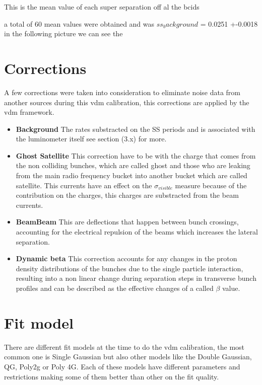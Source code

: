 This is the mean value of each super separation off al the bcids

 a total of 60 mean values were obtained and was $ss_background$ = 0.0251 +-0.0018 in the following picture we can see the 



\section{Corrections}

A few corrections were taken into consideration to eliminate noise data from another sources during this vdm calibration, this corrections are applied by the vdm framework. 

\begin{itemize}
  \item \textbf{Background} The rates substracted on the SS periods and is associated with the luminometer itself see section (3.x) for more.
  \item \textbf {Ghost Satellite} This correction have to be with the charge that comes from the non colliding bunches, which are called ghost and those who are leaking from the main radio frequency bucket into another bucket which are called satellite. This currents have an effect on the $\sigma_{visible}$ measure because of the contribution on the charges, this charges are substracted from the beam currents.  \cite{ghost}
  \item \textbf{BeamBeam} This are deflections that happen between bunch crossings, accounting for the electrical repulsion of the beams which increases the lateral separation.   \cite{beambeam}
  \item \textbf{Dynamic beta} This correction accounts for any changes in the proton density distributions of the bunches due to the single particle interaction, resulting into a non linear change during separation steps in transverse bunch profiles and can be described as the effective changes of a called $\beta$ value. \cite{LHClum}
\end{itemize}


\section{Fit model} 

There are different fit models at the time to do the vdm calibration, the most common one is Single Gaussian but also other models like the Double Gaussian, QG, Poly2g or Poly 4G. Each of these models have different parameters and restrictions making some of them better than other on the fit quality. 

